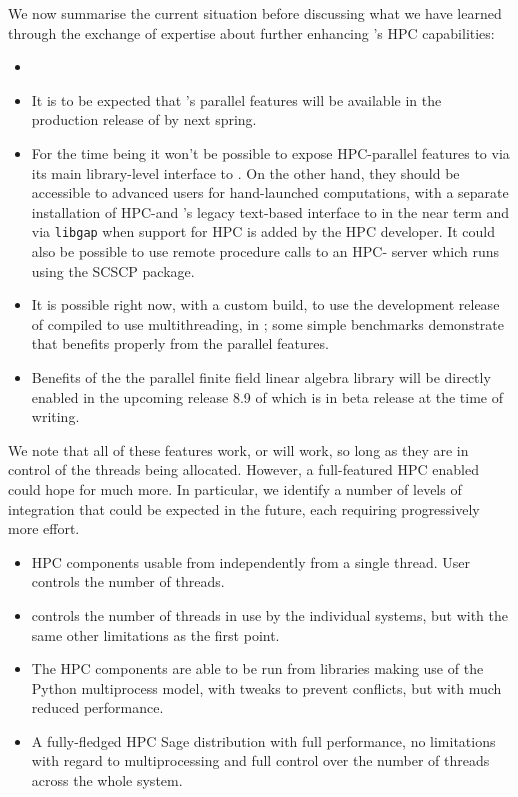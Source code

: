 \documentclass{deliverablereport}
\begin{document}
We now summarise the current situation before discussing what we have learned through
the exchange of expertise about further enhancing \SageMath's HPC capabilities:
\begin{itemize}
\item 
\item It is to be expected that \Singular's parallel features will be
  available in the production release of \SageMath by next spring.
\item For the time being it won't be possible to expose HPC-\GAP parallel
  features to \SageMath via its main library-level interface to \GAP. On the
  other hand, they should be accessible to advanced users for hand-launched
  computations, with a separate installation of HPC-\GAP and \Sage's legacy
  text-based interface to \GAP in the near term and via \texttt{libgap} when
  support for HPC \GAP is added by the HPC \GAP developer. It could also be
  possible to use remote procedure calls to an HPC-\GAP 
  server which runs using the SCSCP \GAP package.
\item It is possible right now, with a custom build, to use the development
  release of \Pari compiled to use multithreading, in \SageMath;
  some simple benchmarks demonstrate that \Sage benefits properly from the
  parallel features.
\item Benefits of the the parallel finite field linear algebra library \Linbox
  will be directly enabled in the upcoming release 8.9 of \SageMath which is in
  beta release at the time of writing.
\end{itemize}

We note that all of these features work, or will work, so long as they are in
control of the threads being allocated. However, a full-featured HPC enabled
\SageMath could hope for much more. In particular, we identify a number of levels
of integration that could be expected in the future, each requiring progressively
more effort.

\begin{itemize}
\item HPC components usable from \SageMath independently from a single \Python
  thread. User controls the number of threads.

\item \SageMath controls the number of threads in use by the individual systems,
  but with the same other limitations as the first point.
  
\item The HPC components are able to be run from libraries making use of the
  Python multiprocess model, with tweaks to prevent conflicts, but with much
  reduced performance.
  
\item A fully-fledged HPC Sage distribution with full performance, no limitations
  with regard to multiprocessing and full control over the number of threads
  across the whole system.
\end{itemize}
\end{document}
